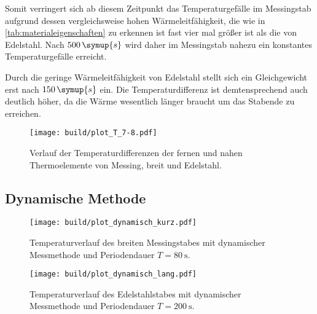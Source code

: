 Somit verringert sich ab diesem Zeitpunkt das Temperaturgefälle im Messingstab aufgrund dessen vergleichsweise
hohen Wärmeleitfähigkeit, die wie in \autoref{tab:materialeigenschaften} zu erkennen ist fast vier mal größer ist
als die von Edelstahl.
Nach $500\,\symup{s}$ wird daher im Messingstab nahezu ein konstantes Temperaturgefälle erreicht.

Durch die geringe Wärmeleitfähigkeit von Edelstahl stellt sich ein Gleichgewicht erst nach  $150\,\symup{s}$ ein.
Die Temperaturdifferenz ist demtensprechend auch deutlich höher, da die Wärme wesentlich länger braucht
um das Stabende zu erreichen.


\begin{figure} [H]
  \centering
  \texttt{[image: build/plot\_T\_7-8.pdf]}
  \caption{Verlauf der Temperaturdifferenzen der fernen und nahen %
  Thermoelemente von Messing, breit und Edelstahl.}
  \label{fig:temperaturdifferenzen, messing, edelstahl}
\end{figure}

\subsection{Dynamische Methode}

\begin{figure} [H]
  \centering
  \texttt{[image: build/plot\_dynamisch\_kurz.pdf]}
  \caption{Temperaturverlauf des breiten Messingstabes mit dynamischer Messmethode und %
  Periodendauer $T=\qty{80}{\second}$.}
  \label{fig:temperaturdifferenzen kurz, messing, edelstahl}
\end{figure}

\begin{figure} [H]
  \centering
  \texttt{[image: build/plot\_dynamisch\_lang.pdf]} 
  \caption{Temperaturverlauf des Edelstahlstabes mit dynamischer Messmethode und %
  Periodendauer $T=\qty{200}{\second}$.}
  \label{fig:temperaturdifferenzen lang, messing, edelstahl}
\end{figure}